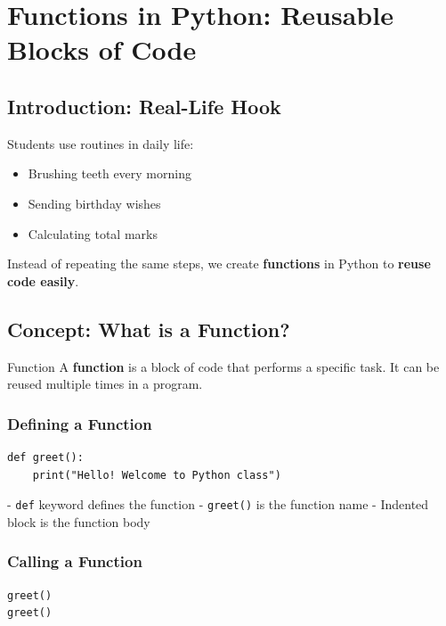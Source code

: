 \chapter{Functions in Python: Reusable Blocks of Code}

\section{Introduction: Real-Life Hook}

Students use routines in daily life:  

\begin{itemize}
    \item Brushing teeth every morning  
    \item Sending birthday wishes  
    \item Calculating total marks  
\end{itemize}

Instead of repeating the same steps, we create \textbf{functions} in Python to \textbf{reuse code easily}.

\section{Concept: What is a Function?}

\begin{definition}{Function}
A \textbf{function} is a block of code that performs a specific task. It can be reused multiple times in a program.
\end{definition}

\subsection{Defining a Function}

\begin{verbatim}
def greet():
    print("Hello! Welcome to Python class")
\end{verbatim}

- \texttt{def} keyword defines the function  
- \texttt{greet()} is the function name  
- Indented block is the function body

\subsection{Calling a Function}

\begin{verbatim}
greet()
greet()
\end{verbatim}

